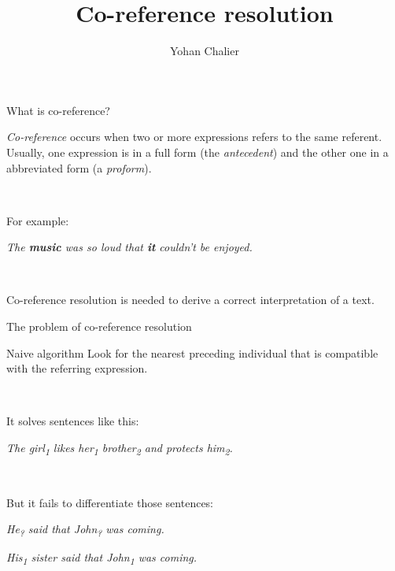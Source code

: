 \documentclass{beamer}
\title{Co-reference resolution}
\author{Yohan Chalier}\institute{Symbolic Natural Language Processing (SD213)}
\begin{document}
\begin{frame}
\titlepage
\end{frame}

\begin{frame}{What is co-reference?}

\emph{Co-reference} occurs when two or more expressions refers to the same referent. Usually, one expression is in a full form (the \emph{antecedent}) and the other one in a abbreviated form (a \emph{proform}).

~\par

For example:

\textit{The \textbf{music} was so loud that \textbf{it} couldn't be enjoyed.}

~\par

Co-reference resolution is needed to derive a correct interpretation of a text.

\end{frame}

\begin{frame}{The problem of co-reference resolution}

\begin{block}{Naive algorithm}
Look for the nearest preceding individual that is compatible with the referring expression.
\end{block}

~\par

It solves sentences like this:

{\em \hspace{\parindent} The girl\textsubscript{1} likes her\textsubscript{1} brother\textsubscript{2} and protects him\textsubscript{2}.}

~\par

But it fails to differentiate those sentences:

{\em \hspace{\parindent} He\textsubscript{?} said that John\textsubscript{?} was coming.}

{\em \hspace{\parindent} His\textsubscript{1} sister said that John\textsubscript{1} was coming.}

\end{frame}
\end{document}

